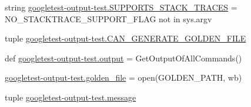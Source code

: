 \begin{DoxyCompactItemize}
\item 
string \mbox{\hyperlink{namespacegoogletest-output-test_a82e006ce33949232748aa4fcd1d228c5}{googletest-\/output-\/test.\+S\+U\+P\+P\+O\+R\+T\+S\+\_\+\+S\+T\+A\+C\+K\+\_\+\+T\+R\+A\+C\+ES}} = N\+O\+\_\+\+S\+T\+A\+C\+K\+T\+R\+A\+C\+E\+\_\+\+S\+U\+P\+P\+O\+R\+T\+\_\+\+F\+L\+AG not in sys.\+argv
\item 
tuple \mbox{\hyperlink{namespacegoogletest-output-test_a7f642ce6ab89839d2ea88a438ef6b1f3}{googletest-\/output-\/test.\+C\+A\+N\+\_\+\+G\+E\+N\+E\+R\+A\+T\+E\+\_\+\+G\+O\+L\+D\+E\+N\+\_\+\+F\+I\+LE}}
\item 
def \mbox{\hyperlink{namespacegoogletest-output-test_ab3df9ce09186215a36c30454cf282417}{googletest-\/output-\/test.\+output}} = Get\+Output\+Of\+All\+Commands()
\item 
\mbox{\hyperlink{namespacegoogletest-output-test_a1f278fb4e124e36b91d94699d921b1c4}{googletest-\/output-\/test.\+golden\+\_\+file}} = open(G\+O\+L\+D\+E\+N\+\_\+\+P\+A\+TH, \textquotesingle{}wb\textquotesingle{})
\item 
tuple \mbox{\hyperlink{namespacegoogletest-output-test_ac8183a857acd7838ccb984117377852e}{googletest-\/output-\/test.\+message}}
\end{DoxyCompactItemize}
